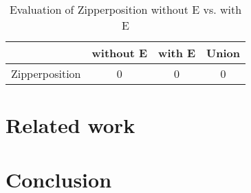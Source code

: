 \documentclass[]{ceurart}
\begin{document}
\begin{table}[ht]
\caption{Evaluation of Zipperposition without E vs. with E}
\centering\begin{tabular}{@{}lccc@{}}
   \toprule
   & without E & with E & Union \\
   \midrule
   Zipperposition & 0 & 0 & 0 \\
   \bottomrule
\end{tabular}
\end{table}

\break

\section{Related work}
\label{sec:related-work}

\section{Conclusion}
\label{sec:conclusion}



\end{document}
